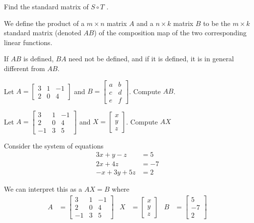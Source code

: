 \begin{applicationActivities}
\begin{activity}{5}
  Find the standard matrix of $S \circ T$ .
\end{activity}

\begin{definition}
We define the product of a $m \times n$ matrix $A$ and a $n \times k$ matrix $B$ to be the $m \times k$ standard matrix (denoted $AB$) of the composition map of the two corresponding linear functions.
\end{definition}

\begin{fact}
If $AB$ is defined, $BA$ need not be defined, and if it is defined, it is in general different from $AB$.
\end{fact}

\begin{activity}{10}
Let $A=\begin{bmatrix} 3 & 1 & -1 \\ 2 & 0 & 4  \end{bmatrix}$ and $B=\begin{bmatrix} a & b \\ c & d\\ e & f \end{bmatrix}$.  Compute $AB$.
\end{activity}


\begin{activity}{5}
Let $A=\begin{bmatrix} 3 & 1 & -1 \\ 2 & 0 & 4 \\ -1 & 3 & 5 \end{bmatrix}$ and $X=\begin{bmatrix} x \\ y \\ z \end{bmatrix}$.
Compute $AX$
\end{activity}

\begin{observation}
Consider the  system of equations
\begin{align*}
3x+y-z &= 5 \\ 2x+4z &= -7 \\ -x+3y+5z &=2
\end{align*}

We can interpret this as a  $AX=B$ where
\begin{align*}
A&=\begin{bmatrix} 3 & 1 & -1 \\ 2 & 0 & 4 \\ -1 & 3 & 5  \end{bmatrix} & X&=\begin{bmatrix} x  \\ y \\ z  \end{bmatrix} & B &= \begin{bmatrix} 5 \\ -7 \\ 2 \end{bmatrix}
\end{align*}


\end{observation}
\end{applicationActivities}

